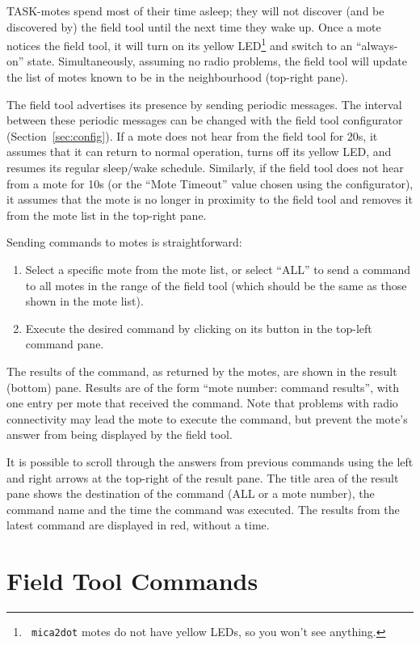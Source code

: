 \documentclass{article}
\begin{document}
TASK-motes spend most of their time asleep; they will not discover (and be
discovered by) the field tool until the next time they wake up. Once a mote
notices the field tool, it will turn on its yellow LED\footnote{{\tt
mica2dot} motes do not have yellow LEDs, so you won't see anything.} and
switch to an ``always-on'' state. Simultaneously, assuming no radio
problems, the field tool will update the list of motes known to be in the
neighbourhood (top-right pane).

The field tool advertises its presence by sending periodic messages. The
interval between these periodic messages can be changed with the field tool
configurator (Section~\ref{sec:config}). If a mote does not hear from the
field tool for 20s, it assumes that it can return to normal operation,
turns off its yellow LED, and resumes its regular sleep/wake
schedule. Similarly, if the field tool does not hear from a mote for 10s
(or the ``Mote Timeout'' value chosen using the configurator), it assumes
that the mote is no longer in proximity to the field tool and removes it
from the mote list in the top-right pane.

Sending commands to motes is straightforward:
\begin{enumerate}
\item Select a specific mote from the mote list, or select ``ALL'' to send
a command to all motes in the range of the field tool (which should be 
the same as those shown in the mote list).
\item Execute the desired command by clicking on its button in the top-left
command pane.
\end{enumerate}
The results of the command, as returned by the motes, are shown in the
result (bottom) pane. Results are of the form ``mote number: command
results'', with one entry per mote that received the command. Note that
problems with radio connectivity may lead the mote to execute the command,
but prevent the mote's answer from being displayed by the field tool.

It is possible to scroll through the answers from previous commands using
the left and right arrows at the top-right of the result pane. The title
area of the result pane shows the destination of the command (ALL or a mote
number), the command name and the time the command was executed. The
results from the latest command are displayed in red, without a time.

\section{Field Tool Commands}
\end{document}
